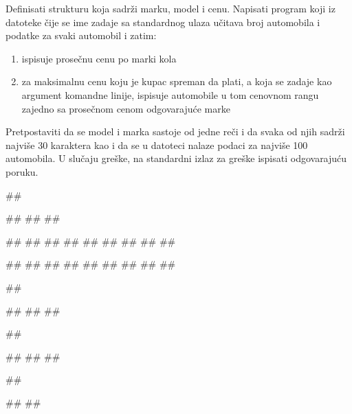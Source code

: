 \begin{Exercise}[label=v3_06] 
Definisati strukturu  koja sadrži marku, model i cenu.
Napisati program koji iz datoteke čije se ime zadaje sa standardnog ulaza učitava broj automobila
i podatke za svaki automobil i zatim:
\begin{enumerate}
\item ispisuje prosečnu cenu po marki kola 
\item za maksimalnu cenu koju je kupac spreman da plati, a koja se
zadaje kao argument komandne linije, ispisuje automobile u tom cenovnom
rangu zajedno sa prosečnom cenom odgovarajuće marke
\end{enumerate}
Pretpostaviti da se model i marka sastoje od jedne reči i
da svaka od njih sadrži najviše 30 karaktera kao i da se u datoteci
nalaze podaci za najviše 100 automobila.
U slučaju greške, na standardni izlaz za greške ispisati odgovarajuću poruku.

\begin{minitest}
\begin{upotreba}{1}
##

#\naslovInt#
##
##

##
##
##
##
##
##
##
##
##

#\naslovIzlaz#
##
##
##
##
##
##
##
##
\end{upotreba}
\end{minitest}
\begin{minitest}
\begin{upotreba}{2}
##

#\naslovInt#
##
##

##

#\naslovIzlazZaGresku#
##
##
\end{upotreba}
\end{minitest}
\begin{minitest}
\begin{upotreba}{3}
##

#\naslovIzlazZaGresku#
##
\end{upotreba}
\end{minitest}
\end{Exercise}
\begin{Answer}[ref=v3_06]
\end{Answer}



